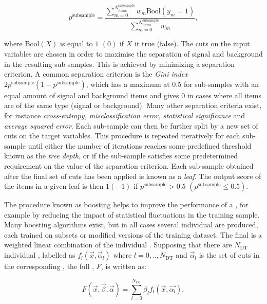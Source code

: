 \begin{equation}
 p^{\textrm{subsample}} = \frac{\sum_{m=0}^{N_{\textrm{items}}^{\textrm{subsample}}} w_{m} \textrm{Bool}(y_m=1)}{\sum_{m=0}^{N_{\textrm{items}}^{\textrm{subsample}}} w_{m}}, 
\end{equation}

where $\textrm{Bool}(X)$ is equal to $1$ $(0)$ if $X$ it true (false). 
The cuts on the input variables are chosen in order to maximise the separation of signal and background in the resulting sub-samples. This is achieved by minimizing a separation criterion. 
A common separation criterion is the \emph{Gini index} $2p^{\textrm{subsample}}(1-p^{\textrm{subsample}})$, which has a maximum at $0.5$ for sub-samples with an equal amount of signal and background items and gives $0$ in cases where all items are of the same type (signal or background). Many other separation criteria exist, for instance \emph{cross-entropy, misclassification error, statistical significance} and \emph{average squared error}.  
Each sub-sample can then be further split by a new set of cuts on the target variables. This procedure is repeated iteratively for each sub-sample until either the number of iterations reaches some predefined threshold known as the \emph{tree depth}, or if the sub-sample satisfies some predetermined requirement on the value of the separation criterion. Each sub-sample obtained after the final set of cuts has been applied is known as a \emph{leaf}. The output score of the items in a given leaf is then $1 (-1)$ if $p^{\textrm{subsample}}>0.5$ $(p^{\textrm{subsample}}\leq0.5)$.

The procedure known as boosting helps to improve the performance of a \DT, for example by reducing the impact of statistical fluctuations in the training sample. Many boosting algorithms exist, but in all cases several individual \DT\s are produced, each trained on subsets or modified versions of the training dataset. The final \BDT is a weighted linear combination of the individual \DT\s. Supposing that there are $N_{\textrm{DT}}$ individual \DT\s, labelled as $f_{l}(\vec{x},\vec{\alpha}_{l})$ where $l=0,..,N_{\textrm{DT}}$ and $\vec{\alpha}_{l}$ is the set of cuts in the corresponding \DT, the full \BDT, $F$, is written as:

\begin{equation}
\label{reco:eq:bdt}
F(\vec{x},\vec{\beta},\vec{\alpha}) = \sum_{l=0}^{N_{\textrm{DT}}} \beta_{l} f_{l}(\vec{x},\vec{\alpha_{l}}), 
\end{equation}

